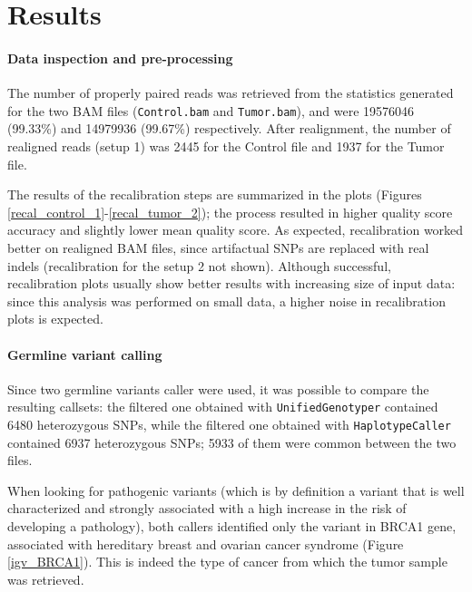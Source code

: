 \documentclass[11pt]{article}
\begin{document}
\section*{Results}

\paragraph{Data inspection and pre-processing}
The number of properly paired reads was retrieved from the statistics generated for the two BAM files (\texttt{Control.bam} and \texttt{Tumor.bam}), and were 19576046 (99.33\%) and 14979936 (99.67\%) respectively. 
After realignment, the number of realigned reads (setup 1) was 2445 for the Control file and 1937 for the Tumor file. 

The results of the recalibration steps are summarized in the plots (Figures \ref{recal_control_1}-\ref{recal_tumor_2}); the process resulted in higher quality score accuracy and slightly lower mean quality score. As expected, recalibration worked better on realigned BAM files, since artifactual SNPs are replaced with real indels (recalibration for the setup 2 not shown). Although successful, recalibration plots usually show better results with increasing size of input data: since this analysis was performed on small data, a higher noise in recalibration plots is expected. 

\paragraph{Germline variant calling} 
Since two germline variants caller were used, it was possible to compare the resulting callsets: the filtered one obtained with \texttt{UnifiedGenotyper} contained 6480 heterozygous SNPs, while the filtered one obtained with \texttt{HaplotypeCaller} contained 6937 heterozygous SNPs; 5933 of them were common between the two files. 

When looking for pathogenic variants (which is by definition a variant that is well characterized and strongly associated with a high increase in the risk of developing a pathology), both callers identified only the variant in BRCA1 gene, associated with hereditary breast and ovarian cancer syndrome (Figure \ref{igv_BRCA1}). This is indeed the type of cancer from which the tumor sample was retrieved.
\end{document}

